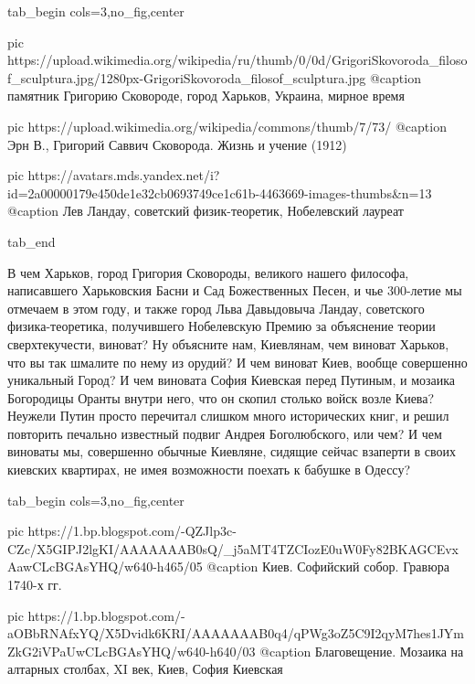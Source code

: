 \ifcmt
  tab_begin cols=3,no_fig,center

     pic https://upload.wikimedia.org/wikipedia/ru/thumb/0/0d/GrigoriSkovoroda_filosof_sculptura.jpg/1280px-GrigoriSkovoroda_filosof_sculptura.jpg
		 @caption памятник Григорию Сковороде, город Харьков, Украина, мирное время

		 pic https://upload.wikimedia.org/wikipedia/commons/thumb/7/73/%
		 @caption Эрн В., Григорий Саввич Сковорода. Жизнь и учение (1912)

		 pic https://avatars.mds.yandex.net/i?id=2a00000179e450de1e32cb0693749ce1c61b-4463669-images-thumbs&n=13
		 @caption Лев Ландау, советский физик-теоретик, Нобелевский лауреат

  tab_end
\fi

В чем Харьков, город Григория
Сковороды, великого нашего философа, написавшего Харьковския Басни и Сад
Божественных Песен, и чье 300-летие мы отмечаем в этом году, и также город Льва
Давыдовыча Ландау, советского физика-теоретика, получившего Нобелевскую Премию
за объяснение теории сверхтекучести, виноват? Ну объясните нам, Киевлянам, чем
виноват Харьков, что вы так шмалите по нему из орудий? И чем виноват Киев,
вообще совершенно уникальный Город? И чем виновата София Киевская перед
Путиным, и мозаика Богородицы Оранты внутри него, что он скопил столько войск
возле Киева?  Неужели Путин просто перечитал слишком много исторических книг, и
решил повторить печально известный подвиг Андрея Боголюбского, или чем? И чем
виноваты мы, совершенно обычные Киевляне, сидящие сейчас взаперти в своих
киевских квартирах, не имея возможности поехать к бабушке в Одессу?


\ifcmt
  tab_begin cols=3,no_fig,center

     pic https://1.bp.blogspot.com/-QZJlp3c-CZc/X5GIPJ2lgKI/AAAAAAAB0sQ/_j5aMT4TZCIozE0uW0Fy82BKAGCEvxAawCLcBGAsYHQ/w640-h465/05%
		 @caption Киев. Софийский собор. Гравюра 1740-х гг.

     pic https://1.bp.blogspot.com/-aOBbRNAfxYQ/X5Dvidk6KRI/AAAAAAAB0q4/qPWg3oZ5C9I2qyM7hes1JYmZkG2iVPaUwCLcBGAsYHQ/w640-h640/03%
		 @caption Благовещение. Мозаика на алтарных столбах, XI век, Киев, София Киевская

